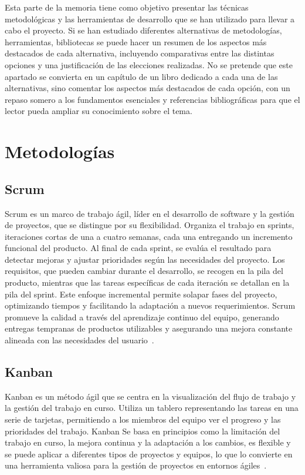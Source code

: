 Esta parte de la memoria tiene como objetivo presentar las técnicas metodológicas y las herramientas de desarrollo que se han utilizado para llevar a cabo el proyecto. Si se han estudiado diferentes alternativas de metodologías, herramientas, bibliotecas se puede hacer un resumen de los aspectos más destacados de cada alternativa, incluyendo comparativas entre las distintas opciones y una justificación de las elecciones realizadas. 
No se pretende que este apartado se convierta en un capítulo de un libro dedicado a cada una de las alternativas, sino comentar los aspectos más destacados de cada opción, con un repaso somero a los fundamentos esenciales y referencias bibliográficas para que el lector pueda ampliar su conocimiento sobre el tema.

\section{Metodologías}

\subsection{Scrum}

Scrum es un marco de trabajo ágil, líder en el desarrollo de software y la gestión de proyectos, 
que se distingue por su flexibilidad. Organiza el trabajo en sprints, iteraciones cortas de una a cuatro 
semanas, cada una entregando un incremento funcional del producto. 
Al final de cada sprint, se evalúa el resultado para detectar mejoras 
y ajustar prioridades según las necesidades del proyecto. Los requisitos, que pueden cambiar durante el 
desarrollo, se recogen en la pila del producto, mientras que las tareas específicas de cada iteración se 
detallan en la pila del sprint. Este enfoque incremental permite solapar fases del proyecto, optimizando 
tiempos y facilitando la adaptación a nuevos requerimientos. Scrum promueve la calidad a través del
aprendizaje continuo del equipo, generando entregas tempranas de productos utilizables y asegurando una 
mejora constante alineada con las necesidades del usuario~\cite{wiki:Scrum}.

\subsection{Kanban}
Kanban es un método ágil que se centra en la visualización del flujo de trabajo y la gestión del
trabajo en curso. Utiliza un tablero representando las tareas en una serie de tarjetas, permitiendo a los
miembros del equipo ver el progreso y las prioridades del trabajo.
Kanban Se basa en principios como la limitación del trabajo en curso, la mejora continua y la
adaptación a los cambios, es flexible y se puede aplicar a diferentes tipos de proyectos y equipos,
lo que lo convierte en una herramienta valiosa para la gestión de proyectos en entornos ágiles~\cite{wiki:Kanban}.

